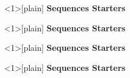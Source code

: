 \documentclass{beamer}
\begin{document}

\begin{frame}<1>[plain]
  \centering
  {\LARGE\bfseries Sequences Starters}\\[0.5em]
\end{frame}
\begin{frame}<1>[plain]
  \centering
  {\LARGE\bfseries Sequences Starters}\\[0.5em]
\end{frame}
\begin{frame}<1>[plain]
  \centering
  {\LARGE\bfseries Sequences Starters}\\[0.5em]
\end{frame}
\begin{frame}<1>[plain]
  \centering
  {\LARGE\bfseries Sequences Starters}\\[0.5em]
\end{frame}
\end{document}
